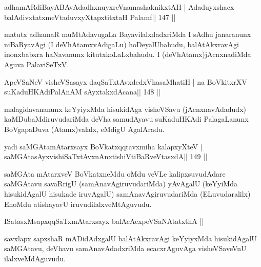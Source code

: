 \begin{shl}
adhamARdiBayABAvAdadhxnuyxreVnamashaknikxtAH |
Adaduyxshacx balAdivxtatxmeVtaduvxyXtapxtitxtaH Palamf\hfill || 147 ||
\end{shl}

\begin{artha}
matutx adhamaR muMtAdavugaLa BayavilalxdadxriMda I sAdhu janaranunx niBaRyavAgi (I deVhAtamxvAdigaLu) hoDeyalUbahudu, balAtAkxravAgi inonxbabxra haNavanunx kitutxkoLaLxbahudu. I (deVhAtamx)jAcnxnadiMda Aguva PalaviSeTxV.
\end{artha}


\begin{shl}
ApeVSaNeV visheVSasayx daqSaTxtAvxdedxVhasaMhatiH |
na BoVkitxrXV suKaduHKAdiPalAnAM sAyxtakxdAcana\hfill || 148 ||
\end{shl}

\begin{artha}
malagidavananunx keYyiyxMda hisukidAga visheVSavu (jAcnxnavAdadudx) kaMDubaMdiruvudariMda deVha samudAyavu suKaduHKAdi PalagaLanunx BoVgapaDuva (Atamx)valalx, eMdigU AgalAradu.
\end{artha}


\begin{shl}
yadi saMGAtamAtarxsayx BoVkatxqqtavxmiha kalapxyXteV |
saMGAtasAyxvishiSaTxtAvxnAnxtishiVtiBaRveVtasxdA\hfill || 149 ||
\end{shl}

\begin{artha}
saMGAta mAtarxveV BoVkatxneMdu oMdu veVLe kalipxsuvudAdare saMGAtavu 
savaRrigU (samAnavAgiruvudariMda) yAvAgalU (keYyiMda hisukidAgalU 
hisukade iruvAgalU) samAnavAgiruvudariMda (ELuvudaralilx) EnoMdu 
atishayavU iruvudilalxveMtAguvudu.
\end{artha}


\begin{shl}
ISatasxMsapxqqSaTxmAtarxsayx balAcAcx\s\s peVSaNAtatxthA ||
\end{shl}

\begin{artha}
savxlapx sapxshaR mADidAdxgalU balAtAkxravAgi keYyiyxMda hisukidAgalU saMGAtavu, deVhavu samAnavAdadxriMda ecacxrAguvAga visheVSaveVnU ilalxveMdAguvudu.
\end{artha}


